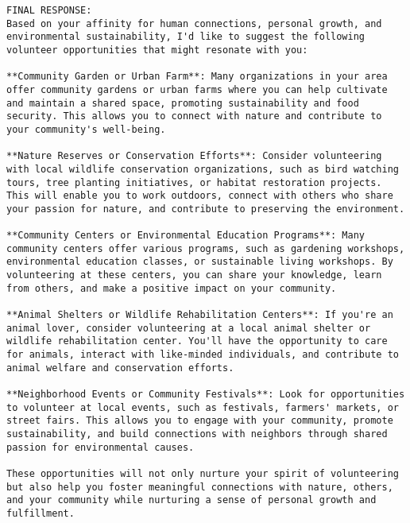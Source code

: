 \begin{lstlisting}[frame=single,breaklines=true]
FINAL RESPONSE:
Based on your affinity for human connections, personal growth, and environmental sustainability, I'd like to suggest the following volunteer opportunities that might resonate with you:

**Community Garden or Urban Farm**: Many organizations in your area offer community gardens or urban farms where you can help cultivate and maintain a shared space, promoting sustainability and food security. This allows you to connect with nature and contribute to your community's well-being.

**Nature Reserves or Conservation Efforts**: Consider volunteering with local wildlife conservation organizations, such as bird watching tours, tree planting initiatives, or habitat restoration projects. This will enable you to work outdoors, connect with others who share your passion for nature, and contribute to preserving the environment.

**Community Centers or Environmental Education Programs**: Many community centers offer various programs, such as gardening workshops, environmental education classes, or sustainable living workshops. By volunteering at these centers, you can share your knowledge, learn from others, and make a positive impact on your community.

**Animal Shelters or Wildlife Rehabilitation Centers**: If you're an animal lover, consider volunteering at a local animal shelter or wildlife rehabilitation center. You'll have the opportunity to care for animals, interact with like-minded individuals, and contribute to animal welfare and conservation efforts.

**Neighborhood Events or Community Festivals**: Look for opportunities to volunteer at local events, such as festivals, farmers' markets, or street fairs. This allows you to engage with your community, promote sustainability, and build connections with neighbors through shared passion for environmental causes.

These opportunities will not only nurture your spirit of volunteering but also help you foster meaningful connections with nature, others, and your community while nurturing a sense of personal growth and fulfillment.

\end{lstlisting}

